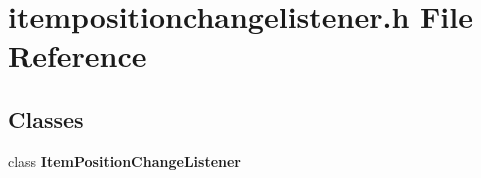 \section{itempositionchangelistener.\+h File Reference}
\label{curve_2itempositionchangelistener_8h}
\subsection*{Classes}
\begin{DoxyCompactItemize}
\item 
class {\bf Item\+Position\+Change\+Listener}
\end{DoxyCompactItemize}

